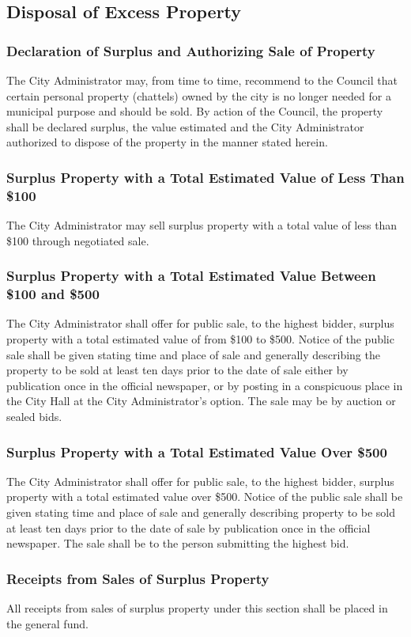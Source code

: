 \subsection{Disposal of Excess Property}
\subsubsection{Declaration of Surplus and Authorizing Sale of Property}
The City Administrator may, from time to time, recommend to the Council that certain personal property (chattels) owned by the city is no longer needed for a municipal purpose and should be sold. By action of the Council, the property shall be declared surplus, the value estimated and the City Administrator authorized to dispose of the property in the manner stated herein.
\subsubsection{Surplus Property with a Total Estimated Value of Less Than \$100}
The City Administrator may sell surplus property with a total value of less than \$100 through negotiated sale.
\subsubsection{Surplus Property with a Total Estimated Value Between \$100 and \$500}
The City Administrator shall offer for public sale, to the highest bidder, surplus property with a total estimated value of from \$100 to \$500. Notice of the public sale shall be given stating time and place of sale and generally describing the property to be sold at least ten days prior to the date of sale either by publication once in the official newspaper, or by posting in a conspicuous place in the City Hall at the City Administrator’s option. The sale may be by auction or sealed bids.
\subsubsection{Surplus Property with a Total Estimated Value Over \$500}
The City Administrator shall offer for public sale, to the highest bidder, surplus property with a total estimated value over \$500.  Notice of the public sale shall be given stating time and place of sale and generally describing property to be sold at least ten days prior to the date of sale by publication once in the official newspaper.  The sale shall be to the person submitting the highest bid.
\subsubsection{Receipts from Sales of Surplus Property}
All receipts from sales of surplus property under this section shall be placed in the general fund.
